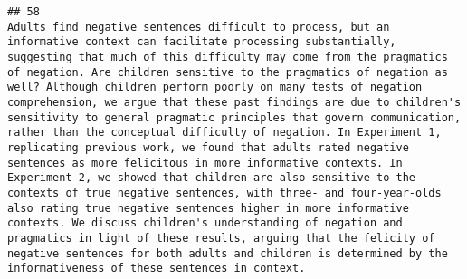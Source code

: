 \documentclass[
  english,
  man]{apa6}
\begin{document}
\begin{verbatim}
## 58                                                                                                                                                                                                                                                                                                                                                                                                                                                                                                                                                                                                                                                                                                                                                                                                                                                                                                                                                                                                                                                                                                                                                                                                                                                                                                                                                                                                                                                                                                                                Adults find negative sentences difficult to process, but an informative context can facilitate processing substantially, suggesting that much of this difficulty may come from the pragmatics of negation. Are children sensitive to the pragmatics of negation as well? Although children perform poorly on many tests of negation comprehension, we argue that these past findings are due to children's sensitivity to general pragmatic principles that govern communication, rather than the conceptual difficulty of negation. In Experiment 1, replicating previous work, we found that adults rated negative sentences as more felicitous in more informative contexts. In Experiment 2, we showed that children are also sensitive to the contexts of true negative sentences, with three- and four-year-olds also rating true negative sentences higher in more informative contexts. We discuss children's understanding of negation and pragmatics in light of these results, arguing that the felicity of negative sentences for both adults and children is determined by the informativeness of these sentences in context.

\end{verbatim}
\end{document}
